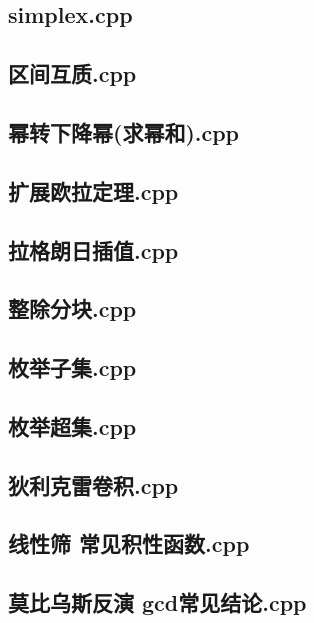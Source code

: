 \subsection{simplex.cpp}


\subsection{区间互质.cpp}


\subsection{幂转下降幂(求幂和).cpp}


\subsection{扩展欧拉定理.cpp}


\subsection{拉格朗日插值.cpp}


\subsection{整除分块.cpp}


\subsection{枚举子集.cpp}


\subsection{枚举超集.cpp}


\subsection{狄利克雷卷积.cpp}


\subsection{线性筛 常见积性函数.cpp}


\subsection{莫比乌斯反演 gcd常见结论.cpp}


